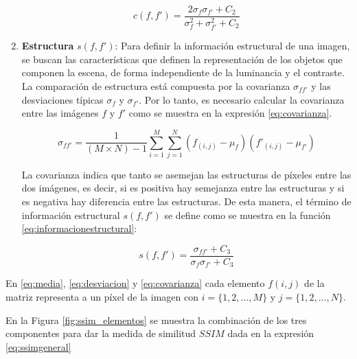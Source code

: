 \begin{enumerate}
    \begin{equation}
        c(f,f')=\frac{2\sigma_f\sigma_{f'}+C_2}{\sigma_f^2+\sigma_{f'}^2+C_2}
        \label{eq:terminocontraste}
    \end{equation}

    \item \textbf{Estructura} $s(f,f')$: Para definir la información estructural de una imagen, se buscan las características que definen la representación de los objetos que componen la escena, de forma independiente de la luminancia y el contraste. La comparación de estructura está compuesta por la covarianza $\sigma_{ff'}$ y las desviaciones típicas $\sigma_f$ y $\sigma_{f'}$. Por lo tanto, es necesario calcular la covarianza entre las imágenes $f$ y $f'$ como se muestra en la expresión \eqref{eq:covarianza}.
    
    \begin{equation}\label{eq:covarianza}
        \sigma_{ff'}=\frac{1}{(M \times N)-1}\sum_{i=1}^M\sum_{j=1}^N(f_{(i,j)}-\mu_f)({f'}_{(i,j)}-\mu_{f'})
    \end{equation}
    
    La covarianza indica que tanto se asemejan las estructuras de píxeles entre las dos imágenes, es decir, si es positiva hay semejanza entre las estructuras y si es negativa hay diferencia entre las estructuras. De esta manera, el término de información estructural $s(f,f')$ se define como se muestra en la función \eqref{eq:informacionestructural}:
    
    \begin{equation}
        s(f,f')=\frac{\sigma_{ff'}+C_3}{\sigma_f\sigma_{f'}+C_3}
        \label{eq:informacionestructural}
    \end{equation}
\end{enumerate}

En \eqref{eq:media}, \eqref{eq:desviacion} y \eqref{eq:covarianza} cada elemento $f(i,j)$ de la matriz representa a un píxel de la imagen con $i=\{1,2,...,M\}$ y $j=\{1,2,...,N\}$.


En la Figura \ref{fig:ssim_elementos} se muestra la combinación de los tres componentes para dar la medida de similitud $SSIM$ dada en la expresión \eqref{eq:ssimgeneral}

